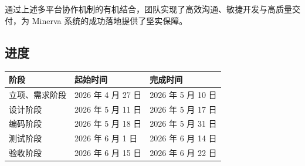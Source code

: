 通过上述多平台协作机制的有机结合，团队实现了高效沟通、敏捷开发与高质量交付，为 Minerva 系统的成功落地提供了坚实保障。

\subsection{进度}

\begin{longtable}{|p{34mm}|p{48mm}|p{66mm}|}
\hline
\textbf{阶段} & \textbf{起始时间} & \textbf{完成时间} \\
\hline
立项、需求阶段 & 2026 年 4 月 27 日 & 2026 年 5 月 10 日 \\
\hline
设计阶段 & 2026 年 5 月 11 日 & 2026 年 5 月 17 日 \\
\hline
编码阶段 & 2026 年 5 月 18 日 & 2026 年 5 月 31 日 \\
\hline
测试阶段 & 2026 年 6 月 1 日 & 2026 年 6 月 14 日 \\
\hline
验收阶段 & 2026 年 6 月 15 日 & 2026 年 6 月 22 日 \\
\end{longtable}
